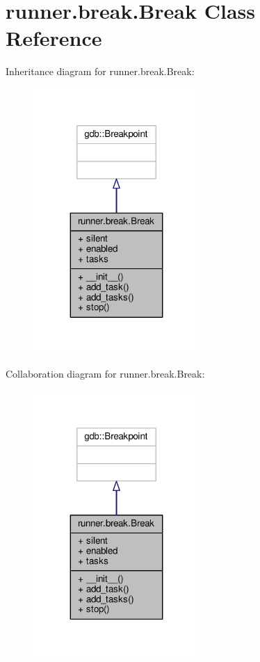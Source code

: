 \hypertarget{classrunner_1_1break_1_1Break}{}\section{runner.\+break.\+Break Class Reference}
\label{classrunner_1_1break_1_1Break}


Inheritance diagram for runner.\+break.\+Break\+:
\nopagebreak
\begin{figure}[H]
\begin{center}
\leavevmode
\includegraphics[width=179pt]{classrunner_1_1break_1_1Break__inherit__graph}
\end{center}
\end{figure}


Collaboration diagram for runner.\+break.\+Break\+:
\nopagebreak
\begin{figure}[H]
\begin{center}
\leavevmode
\includegraphics[width=179pt]{classrunner_1_1break_1_1Break__coll__graph}
\end{center}
\end{figure}
